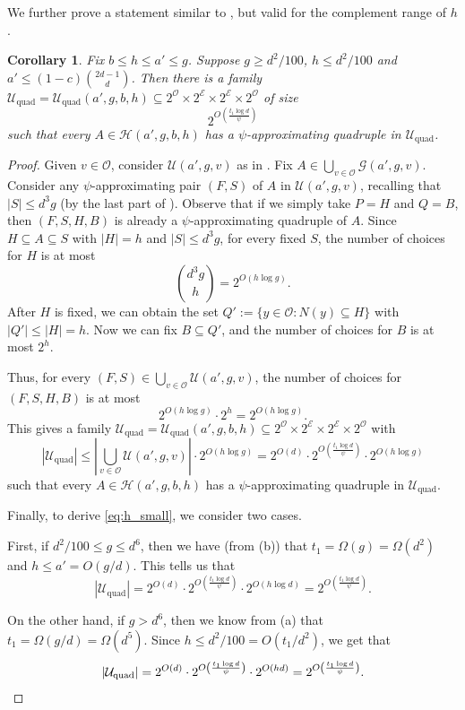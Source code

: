 \documentclass{amsart}
\newtheorem{cor}[thm]{Corollary}
\theoremstyle{definition}
\newcommand{\cO}{\mathcal{O} }
\newcommand{\cE}{\mathcal{E} }
\newcommand{\cG}{\mathcal{G} }
\newcommand{\cH}{\mathcal{H} }
\newcommand{\cU}{\mathcal{U} }
\newcommand{\qd}{\mathrm{quad}}
\newcommand{\beq}[1]{\begin{equation}\label{#1}}
\newcommand{\enq}[0]{\end{equation}}
\newcommand{\0}[0]{\emptyset}
\begin{document}
We further prove a statement similar to , but valid for the complement range of $h$.

\begin{cor}\label{cor:psi-approx-quad-2}
    Fix $b\leq h\leq a'\leq g$. Suppose $g\geq d^2/100$, $h\leq d^2/100$ and $a'\leq (1-c)\binom{2d-1}{d}$. Then there is a family $\mathcal U_{\qd}=\cU_{\qd}(a',g,b,h)\subseteq 2^{\cO}\times 2^{\cE}\times 2^{\cE}\times 2^{\cO}$ of size
    \beq{eq:h_small}
    2^{O\left(\frac{t_1\log d}{\psi}\right)}
    \enq
    such that every $A\in\cH(a',g,b,h)$ has a $\psi$-approximating quadruple in $\mathcal U_{\qd}$.
\end{cor}
\begin{proof} 
Given $v\in \cO$, consider $\cU(a',g,v)$ as in . 
Fix $A\in \bigcup_{v\in \cO}\cG(a',g,v)$. Consider any $\psi$-approximating pair $(F,S)$ of $A$ in $\cU(a',g,v)$, recalling that $|S|\leq d^3g$ (by the last part of ). Observe that if we simply take $P=H$ and $Q=B$, then
$(F,S,H,B)$ is already a $\psi$-approximating quadruple of $A$. Since $H\subseteq A\subseteq S$ with $|H|= h$ and $|S|\leq d^3g$, for every fixed $S$, the number of choices for $H$ is at most
    \[
    \binom{d^3g}{h}= 2^{O(h\log g)}.
    \]
    After $H$ is fixed, we can obtain the set $Q':=\{y\in \cO : N(y)\subseteq H\}$ with $|Q'|\leq |H|=h$. Now we can fix $B\subseteq Q'$, and the number of choices for $B$ is at most $2^h$.
    
    Thus, for every $(F,S)\in\bigcup_{v\in \cO}\cU(a',g,v)$, the number of choices for $(F,S,H,B)$ is at most 
    \[
    2^{O(h\log g)}\cdot 2^h=2^{O(h\log g)}.
    \]
    This gives a family $\mathcal U_{\qd}=\cU_{\qd}(a',g,b,h)\subseteq 2^{\cO}\times 2^{\cE}\times 2^{\cE}\times 2^{\cO}$ with 
    \[
    |\mathcal U_{\qd}|\leq \left|\bigcup_{v\in \cO}\cU(a',g,v)\right|\cdot 2^{O(h\log g)}= 2^{O(d)}\cdot 2^{O\left(\frac{t_1\log d}{\psi}\right)}\cdot 2^{O(h\log g)}
    \]
    such that every $A\in\cH(a',g,b,h)$ has a $\psi$-approximating quadruple in $\mathcal U_{\qd}$. 
    
    Finally, to derive \eqref{eq:h_small}, we consider two cases.
    
    First, if $d^2/100\leq g\leq d^6$, then we have (from (b)) that $t_1=\Omega(g)=\Omega(d^2)$ and $h\leq a'=O(g/d)$. This tells us that  
    \[
    |\cU_{\qd}|= 2^{O(d)}\cdot 2^{O\left(\frac{t_1\log d}{\psi}\right)}\cdot 2^{O(h\log d)}=2^{O\left(\frac{t_1\log d}{\psi}\right)}.
    \]

    On the other hand, if $g> d^6$, then we know from (a) that $t_1=\Omega(g/d)=\Omega(d^5)$. Since $h\leq d^2/100= O(t_1/d^2)$, we get that
    \[
    |\cU_{\qd}|= 2^{O(d)}\cdot 2^{O\left(\frac{t_1\log d}{\psi}\right)}\cdot 2^{O(hd)}=2^{O\left(\frac{t_1\log d}{\psi}\right)}. \qedhere
    \]
\end{proof}
\end{document}
